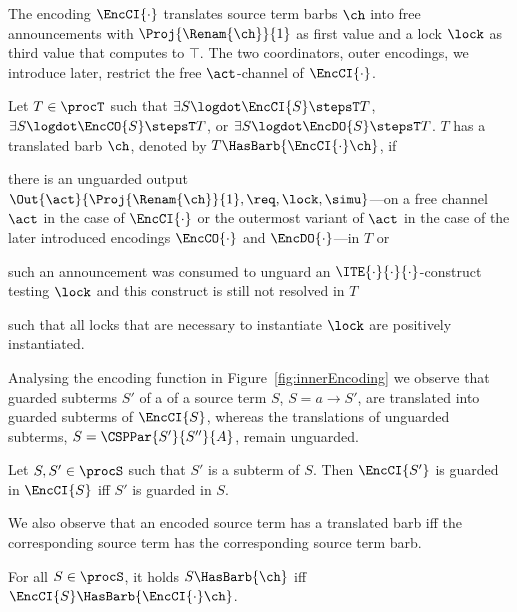 \documentclass[]{eptcs}
\begin{document}
The encoding $ \EncCI{\cdot} $ translates source term barbs $ \ch $ into free announcements with $ \Proj{\Renam{\ch}}{1} $ as first value and a lock $ \lock $ as third value that computes to $ \top $. The two coordinators, \ie outer encodings, we introduce later, restrict the free $ \act $-channel of $ \EncCI{\cdot} $.

\begin{definition}
	Let $ T \in \procT $ such that $ \exists S\logdot \EncCI{S} \stepsT T $, $ \exists S\logdot \EncCO{S} \stepsT T $, or $ \exists S\logdot \EncDO{S} \stepsT T $.
	$ T $ has a translated barb $ \ch $, denoted by $ T\HasBarb{\EncCI{\cdot}\ch} $, if
	\begin{compactitem}
		\item there is an unguarded output $ \Out{\act}{\Proj{\Renam{\ch}}{1}, \req, \lock, \simu} $---on a free channel $ \act $ in the case of $ \EncCI{\cdot} $ or the outermost variant of $ \act $ in the case of the later introduced encodings $ \EncCO{\cdot} $ and $ \EncDO{\cdot} $---in $ T $ or
		\item such an announcement was consumed to unguard an $ \ITE{\cdot}{\cdot}{\cdot} $-construct testing $ \lock $ and this construct is still not resolved in $ T $
	\end{compactitem}
	such that all locks that are necessary to instantiate $ \lock $ are positively instantiated.
\end{definition}

Analysing the encoding function in Figure~\ref{fig:innerEncoding} we observe that guarded subterms $ S' $ of a of a source term $ S $, \eg $ S = a \rightarrow S' $, are translated into guarded subterms of $ \EncCI{S} $, whereas the translations of unguarded subterms, \eg $ S = \CSPPar{S'}{S''}{A} $, remain unguarded.

\begin{obs}
	$ $\\
	Let $ S, S' \in \procS $ such that $ S' $ is a subterm of $ S $. Then $ \EncCI{S'} $ is guarded in $ \EncCI{S} $ iff $ S' $ is guarded in $ S $.
	\label{obs:guardedSourceVsTarget}
\end{obs}

We also observe that an encoded source term has a translated barb iff the corresponding source term has the corresponding source term barb.

\begin{obs}
	For all $ S \in \procS $, it holds $ S\HasBarb{\ch} $ iff $ \EncCI{S}\HasBarb{\EncCI{\cdot}\ch} $.
	\label{obs:transBarbs}
\end{obs}
\end{document}
